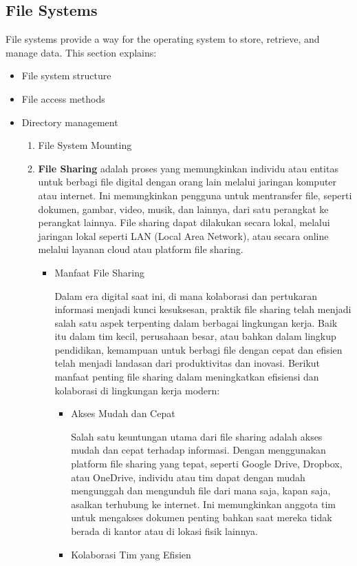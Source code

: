 \documentclass[12pt]{article}
\begin{document}
\subsection{File Systems}
File systems provide a way for the operating system to store, retrieve, and manage data. This section explains:
\begin{itemize}
    \item File system structure
    \item File access methods
    \item Directory management
    \begin{enumerate}
        \item File System Mounting 
        \item \textbf{File Sharing} adalah proses yang memungkinkan individu atau entitas untuk berbagi file digital dengan orang lain melalui jaringan komputer atau internet. Ini memungkinkan pengguna untuk mentransfer file, seperti dokumen, gambar, video, musik, dan lainnya, dari satu perangkat ke perangkat lainnya. File sharing dapat dilakukan secara lokal, melalui jaringan lokal seperti LAN (Local Area Network), atau secara online melalui layanan cloud atau platform file sharing.
        \begin{itemize}
            \item {Manfaat File Sharing} 
            
            Dalam era digital saat ini, di mana kolaborasi dan pertukaran informasi menjadi kunci kesuksesan, praktik file sharing telah menjadi salah satu aspek terpenting dalam berbagai lingkungan kerja. Baik itu dalam tim kecil, perusahaan besar, atau bahkan dalam lingkup pendidikan, kemampuan untuk berbagi file dengan cepat dan efisien telah menjadi landasan dari produktivitas dan inovasi.
            Berikut manfaat penting file sharing dalam meningkatkan efisiensi dan kolaborasi di lingkungan kerja modern:
            \begin{itemize}
               \item Akses Mudah dan Cepat 
               
                Salah satu keuntungan utama dari file sharing adalah akses mudah dan cepat terhadap informasi. Dengan menggunakan platform file sharing yang tepat, seperti Google Drive, Dropbox, atau OneDrive, individu atau tim dapat dengan mudah mengunggah dan mengunduh file dari mana saja, kapan saja, asalkan terhubung ke internet. Ini memungkinkan anggota tim untuk mengakses dokumen penting bahkan saat mereka tidak berada di kantor atau di lokasi fisik lainnya.
                \item Kolaborasi Tim yang Efisien


\end{itemize}
\end{itemize}
\end{enumerate}
\end{itemize}
\end{document}
